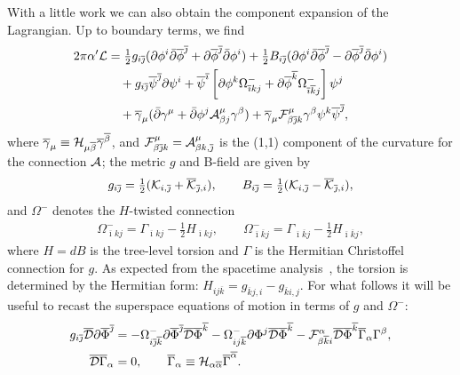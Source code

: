 \documentclass[11pt, a4paper]{article}
\def\cDb{{\overline{\cD}}}
\def\p{\partial}
\def\pb{\bar{\partial}}
\def\ff#1#2{{\textstyle\frac{#1}{#2}}}
\def\cA{{\cal A}}
\def\cD{{\cal D}}
\def\cF{{\cal F}}
\def\cH{{\cal H}}
\def\cK{{\cal K}}
\def\cL{{\cal L}}
\newcommand\alphab{\overline{\alpha}}
\newcommand\betab{\overline{\beta}}
\newcommand\gammab{\overline{\gamma}}
\newcommand\phib{\overline{\phi}}
\newcommand\psib{\overline{\psi}}
\newcommand\Gammab{\overline{\Gamma}}
\newcommand\Phib{\overline{\Phi}}
\newcommand\ib{\overline{\imath}}
\newcommand\jb{\overline{\jmath}}
\newcommand\kb{\overline{k}}
\def\cDb{\overline{\cD}}
\def\cKb{\overline{\cK}}
\begin{document}
With a little work we can also obtain the component expansion of the Lagrangian.
Up to boundary terms, we find
\begin{align}
\label{eq:fullS}
2\pi \alpha' \cL & =\ff{1}{2}g_{i\jb} (\p\phi^i\pb\phib^{\jb}+\p\phib^{\jb} \pb\phi^i)+
\ff{1}{2} B_{i\jb} (\p\phi^i\pb\phib^{\jb}-\p\phib^{\jb} \pb\phi^i) \nonumber\\
&\quad
+g_{i\jb} \psib^{\jb} \p\psi^i + \psib^{\ib} \left[
\p\phi^k \Omega^-_{\ib kj}
+\p\phib^{\kb}\Omega^-_{\ib\kb j} \right]\psi^j \nonumber\\
& \quad+ \gammab_{\mu} ( \pb\gamma^\mu + \pb\phi^j \cA^\mu_{\beta j} \gamma^\beta)
+\gammab_\mu \cF^\mu_{\beta\jb k} \gamma^\beta \psi^k\psib^{\jb},
\end{align}
where $\gammab_\mu \equiv \cH_{\mu\betab} \gammab^{\betab}$,  and
$\cF^\mu_{\beta\jb k}  = \cA^{\mu}_{\beta k,\jb}$ is the (1,1) component of the curvature for the connection $\cA$; the metric $g$
and B-field are given by
\begin{align*}
g_{i\jb} = \ff{1}{2} (\cK_{i,\jb} +\cKb_{\jb,i}), \qquad
B_{i\jb} = \ff{1}{2} (\cK_{i,\jb}-\cKb_{\jb,i}),
\end{align*}
and $\Omega^-$ denotes the $H$-twisted connection 
\begin{align}
\label{eq:Omega}
\Omega^-_{\ib k j} = \Gamma_{\ib k j} - \ff{1}{2} H_{\ib k j} ,\qquad
\Omega^-_{\ib\kb j} = \Gamma_{\ib\kb j} -\ff{1}{2} H_{\ib\kb j},
\end{align}
where $H = d B$ is the tree-level torsion and $\Gamma$ is the Hermitian  Christoffel
connection for $g$.  As expected from the spacetime analysis~\cite{Strominger:1986uh}, the torsion is determined by the Hermitian form: $H_{ij\kb} = g_{\kb j,i}-g_{\kb i,j}$.  For what follows it will be useful to recast
the superspace equations of motion in terms of $g$ and $\Omega^-$:
\begin{align}
\label{eq:eom}
g_{i\jb} \cDb \p \Phib^{\jb}  &=
 - \Omega^-_{i\jb\kb} \p\Phib^{\jb} \cDb\Phib^{\kb}
 - \Omega^-_{ij\kb}  \p \Phi^j \cDb \Phib^{\kb} 
 - \cF^\alpha_{\beta\kb i} \cDb\Phib^{\kb} \Gammab_\alpha \Gamma^\beta, \nonumber\\
 \cDb \Gammab_\alpha & =0, \qquad \Gammab_\alpha \equiv \cH_{\alpha\alphab} \Gammab^{\alphab} .
\end{align}
\end{document}
